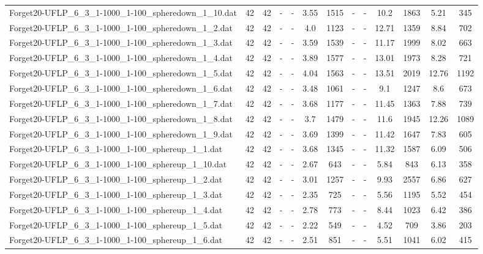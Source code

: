 \begin{table}[!ht]
{\begin{tabular}{lcccccccccccc}
Forget20-UFLP\_6\_3\_1-1000\_1-100\_spheredown\_1\_10.dat & 42 & 42 &  - &  - & 3.55 & 1515 &  - &  - & 10.2 & 1863 & 5.21 & 345 \\
Forget20-UFLP\_6\_3\_1-1000\_1-100\_spheredown\_1\_2.dat & 42 & 42 &  - &  - & 4.0 & 1123 &  - &  - & 12.71 & 1359 & 8.84 & 702 \\
Forget20-UFLP\_6\_3\_1-1000\_1-100\_spheredown\_1\_3.dat & 42 & 42 &  - &  - & 3.59 & 1539 &  - &  - & 11.17 & 1999 & 8.02 & 663 \\
Forget20-UFLP\_6\_3\_1-1000\_1-100\_spheredown\_1\_4.dat & 42 & 42 &  - &  - & 3.89 & 1577 &  - &  - & 13.01 & 1973 & 8.28 & 721 \\
Forget20-UFLP\_6\_3\_1-1000\_1-100\_spheredown\_1\_5.dat & 42 & 42 &  - &  - & 4.04 & 1563 &  - &  - & 13.51 & 2019 & 12.76 & 1192 \\
Forget20-UFLP\_6\_3\_1-1000\_1-100\_spheredown\_1\_6.dat & 42 & 42 &  - &  - & 3.48 & 1061 &  - &  - & 9.1 & 1247 & 8.6 & 673 \\
Forget20-UFLP\_6\_3\_1-1000\_1-100\_spheredown\_1\_7.dat & 42 & 42 &  - &  - & 3.68 & 1177 &  - &  - & 11.45 & 1363 & 7.88 & 739 \\
Forget20-UFLP\_6\_3\_1-1000\_1-100\_spheredown\_1\_8.dat & 42 & 42 &  - &  - & 3.7 & 1479 &  - &  - & 11.6 & 1945 & 12.26 & 1089 \\
Forget20-UFLP\_6\_3\_1-1000\_1-100\_spheredown\_1\_9.dat & 42 & 42 &  - &  - & 3.69 & 1399 &  - &  - & 11.42 & 1647 & 7.83 & 605 \\
Forget20-UFLP\_6\_3\_1-1000\_1-100\_sphereup\_1\_1.dat & 42 & 42 &  - &  - & 3.68 & 1345 &  - &  - & 11.32 & 1587 & 6.09 & 506 \\
Forget20-UFLP\_6\_3\_1-1000\_1-100\_sphereup\_1\_10.dat & 42 & 42 &  - &  - & 2.67 & 643 &  - &  - & 5.84 & 843 & 6.13 & 358 \\
Forget20-UFLP\_6\_3\_1-1000\_1-100\_sphereup\_1\_2.dat & 42 & 42 &  - &  - & 3.01 & 1257 &  - &  - & 9.93 & 2557 & 6.86 & 627 \\
Forget20-UFLP\_6\_3\_1-1000\_1-100\_sphereup\_1\_3.dat & 42 & 42 &  - &  - & 2.35 & 725 &  - &  - & 5.56 & 1195 & 5.52 & 454 \\
Forget20-UFLP\_6\_3\_1-1000\_1-100\_sphereup\_1\_4.dat & 42 & 42 &  - &  - & 2.78 & 773 &  - &  - & 8.44 & 1023 & 6.42 & 386 \\
Forget20-UFLP\_6\_3\_1-1000\_1-100\_sphereup\_1\_5.dat & 42 & 42 &  - &  - & 2.22 & 549 &  - &  - & 4.52 & 709 & 3.86 & 203 \\
Forget20-UFLP\_6\_3\_1-1000\_1-100\_sphereup\_1\_6.dat & 42 & 42 &  - &  - & 2.51 & 851 &  - &  - & 5.51 & 1041 & 6.02 & 415 \\

\end{tabular}}
\end{table}
